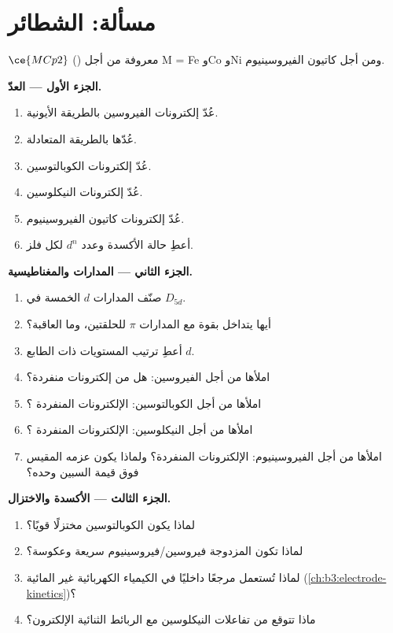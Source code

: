 \section{مسألة: الشطائر}

\begin{problem}
\label{pb:b3:organometallic-bonding:1}
 $\ce{MCp2}$ () معروفة من أجل M = Fe وCo وNi ومن أجل كاتيون الفيروسينيوم.

\medskip\noindent\textbf{الجزء الأول --- العدّ.}
\begin{enumerate}
  \item عُدّ إلكترونات الفيروسين بالطريقة الأيونية.
  \item عُدّها بالطريقة المتعادلة.
  \item عُدّ إلكترونات الكوبالتوسين.
  \item عُدّ إلكترونات النيكلوسين.
  \item عُدّ إلكترونات كاتيون الفيروسينيوم.
  \item أعطِ حالة الأكسدة وعدد $d^n$ لكل فلز.
\end{enumerate}

\medskip\noindent\textbf{الجزء الثاني --- المدارات والمغناطيسية.}
\begin{enumerate}[resume]
  \item صنّف المدارات $d$ الخمسة في $D_{5d}$.
  \item أيها يتداخل بقوة مع المدارات $\pi$ للحلقتين، وما
        العاقبة؟
  \item أعطِ ترتيب المستويات ذات الطابع $d$.
  \item املأها من أجل الفيروسين: هل من إلكترونات منفردة؟
  \item املأها من أجل الكوبالتوسين: الإلكترونات المنفردة ؟
  \item املأها من أجل النيكلوسين: الإلكترونات المنفردة ؟
  \item املأها من أجل الفيروسينيوم: الإلكترونات المنفردة؟ ولماذا يكون عزمه المقيس
        فوق قيمة السبين وحده؟
\end{enumerate}

\medskip\noindent\textbf{الجزء الثالث --- الأكسدة والاختزال.}
\begin{enumerate}[resume]
  \item لماذا يكون الكوبالتوسين مختزلًا قويًا؟
  \item لماذا تكون المزدوجة فيروسين/فيروسينيوم سريعة وعكوسة؟
  \item لماذا تُستعمل مرجعًا داخليًا في الكيمياء الكهربائية غير المائية
        (\cref{ch:b3:electrode-kinetics})؟
  \item ماذا تتوقع من تفاعلات النيكلوسين مع الربائط الثنائية
        الإلكترون؟
\end{enumerate}


\end{problem}
